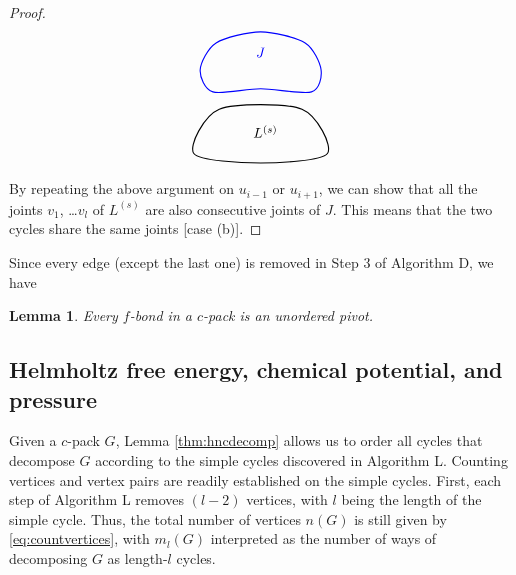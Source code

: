 \documentclass[preprint]{revtex4-1}
\newtheorem{lemm}[thrm]{Lemma}
\begin{document}
\begin{proof}
\[\begin{tikzpicture}
    \draw[draw=black, thick]
      plot [smooth cycle]
      coordinates{ ( 0.8*\sz, 0.6*\sz)
                   ( 2.4*\sz, 3.4*\sz)
                   ( 7.6*\sz, 3.4*\sz)
                   ( 9.2*\sz, 0.6*\sz)
                   ( 5.0*\sz, 0.0*\sz) };

    \node (L) at (5.3*\sz, 2.0*\sz) {$L^{(s)}$};

    \draw[thick, draw=blue]
      plot [smooth cycle]
      coordinates{
                   ( 2.0*\sz, 4.5*\sz)
                   ( 1.2*\sz, 5.9*\sz)
                   ( 2.2*\sz, 7.6*\sz)
                   ( 5.0*\sz, 8.3*\sz)
                   ( 7.8*\sz, 7.6*\sz)
                   ( 8.8*\sz, 5.9*\sz)
                   ( 8.2*\sz, 4.5*\sz)
                   ( 5.0*\sz, 4.7*\sz) };

    \node (J) at (5.0*\sz, 7.0*\sz) [blue] {$J$};
  \end{tikzpicture}
\]

By repeating the above argument on $u_{i-1}$ or $u_{i+1}$,
we can show that
  all the joints $v_1$, \dots $v_l$ of $L^{(s)}$
  are also consecutive joints of $J$.
%
This means that the two cycles share the same joints
  [case (b)].
\end{proof}



Since every edge (except the last one) is removed in Step 3 of Algorithm D,
we have
\begin{lemm}
  Every $f$-bond in a $c$-pack is an unordered pivot.
\label{thm:hncfpivot}
\end{lemm}




\subsection{\label{sec:hncFexmuex}Helmholtz free energy, chemical potential, and pressure}


Given a $c$-pack $G$,
  Lemma \ref{thm:hncdecomp} allows us
  to order all cycles that decompose $G$
  according to the simple cycles
  discovered in Algorithm L.
%
Counting vertices and vertex pairs
  are readily established on the simple cycles.
%
First, each step of Algorithm L removes $(l - 2)$ vertices,
  with $l$ being the length of the simple cycle.
%
Thus, the total number of vertices $n(G)$
  is still given by \eqref{eq:countvertices},
  with $m_l(G)$ interpreted as
  the number of ways
  of decomposing $G$ as length-$l$ cycles.
\end{document}
